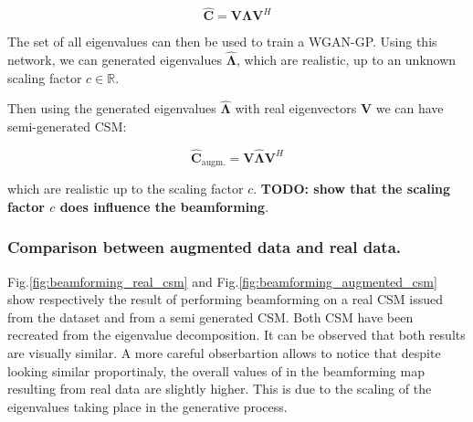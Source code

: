 \documentclass{article}
\begin{document}
\begin{equation}
    \mathbf{\hat{C}} = \mathbf{V} \mathbf{\Lambda} \mathbf{V}^H
\end{equation}


The set of all eigenvalues can then be used to train a WGAN-GP. Using this network, we can generated eigenvalues $\hat{\mathbf{\Lambda}}$, which are realistic, up to an unknown scaling factor $c \in \mathbb{R}$.  


Then using the generated eigenvalues $\hat{\mathbf{\Lambda}}$ with real eigenvectors $\mathbf{V}$ we can have semi-generated CSM:

\begin{equation}
    \mathbf{\hat{C}}_\text{augm.}  = \mathbf{V} \hat{\mathbf{\Lambda}} \mathbf{V}^H
\end{equation}

which are realistic up to the scaling factor $c$. \textbf{TODO: show that the scaling factor $c$ does influence the beamforming}.

\subsubsection{Comparison between augmented data and real data.}


Fig.\ref{fig:beamforming_real_csm} and Fig.\ref{fig:beamforming_augmented_csm} show respectively the result of performing beamforming on a real CSM issued from the dataset and from a semi generated CSM. Both CSM have been recreated from the eigenvalue decomposition. It can be observed that both results are visually similar. A more careful obserbartion allows to notice that despite looking similar proportinaly, the overall values of in the beamforming map resulting from real data are slightly higher. This is due to the scaling of the eigenvalues taking place in the generative process. 
\end{document}
